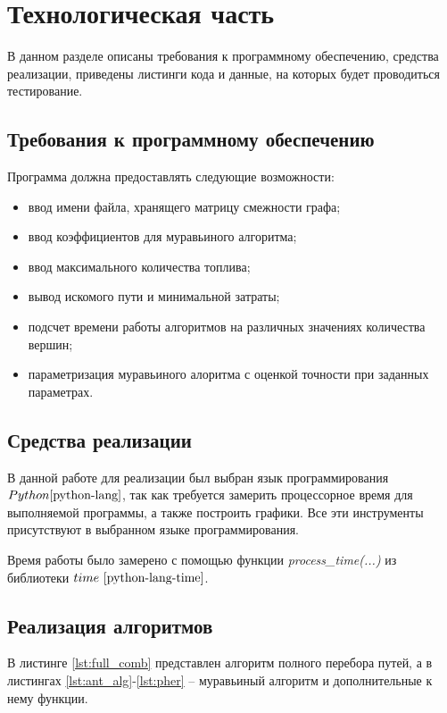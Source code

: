 \chapter{Технологическая часть}

В данном разделе описаны требования к программному обеспечению, средства
реализации, приведены листинги кода и данные, на которых будет проводиться
тестирование.

\section{Требования к программному обеспечению}

Программа должна предоставлять следующие возможности:
\begin{itemize}[left=\parindent]
    \item ввод имени файла, хранящего матрицу смежности графа;
    \item ввод коэффициентов для муравьиного алгоритма;
    \item ввод максимального количества топлива;
    \item вывод искомого пути и минимальной затраты;
    \item подсчет времени работы алгоритмов на различных значениях количества
        вершин;
    \item параметризация муравьиного алоритма с оценкой точности при заданных
        параметрах.
\end{itemize}

\section{Средства реализации}
В данной работе для реализации был выбран язык программирования $Python \cite{python-lang}$, 
так как требуется замерить процессорное время для выполняемой программы, 
а также построить графики. Все эти инструменты присутствуют в выбранном языке программирования.

Время работы было замерено с помощью функции \textit{process\_time(...)} из библиотеки 
$time~\cite{python-lang-time}$.

\clearpage
\section{Реализация алгоритмов}

В листинге \ref{lst:full_comb} представлен алгоритм полного перебора путей, а в листингах \ref{lst:ant_alg}-\ref{lst:pher} -- муравьиный алгоритм и дополнительные к нему функции.

